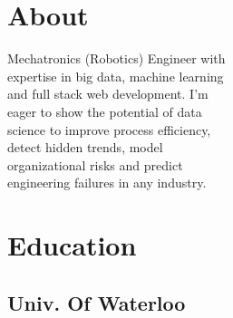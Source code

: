 \documentclass[]{deedy-resume-openfont}
\begin{document}
%
%

%
%



%
%

\begin{minipage}[t]{0.33\textwidth}


\section{About}
Mechatronics (Robotics) Engineer with \\
expertise in big data, machine learning \\
and full stack web development. I'm \\
eager to show the potential of data \\
science to improve process efficiency,\\
detect hidden trends, model \\
organizational risks and predict \\
engineering failures in any industry.


\section{Education}

\subsection{Univ. Of Waterloo}
\sectionsep




\end{minipage}
\end{document}
